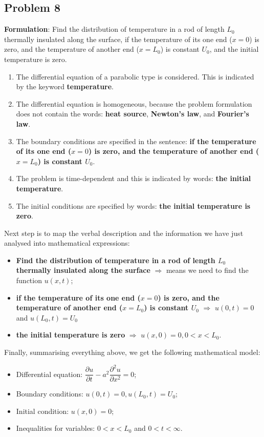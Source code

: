 \subsection{Problem 8}

{\bfseries Formulation}: Find the distribution of temperature in a rod of length $L_{0}$ thermally insulated along the surface, if the temperature of its one end ($x=0$) is zero, and the temperature of another end ($x=L_{0}$) is constant $U_{0}$, and the initial temperature is zero.
\begin{enumerate}
\item The differential equation of a parabolic type is considered. This is indicated by the keyword {\bfseries temperature}.
\item The differential equation is homogeneous, because the problem formulation does not contain the words: {\bfseries heat source}, {\bfseries Newton's law}, and {\bfseries Fourier's law}.
\item The boundary conditions are specified in the sentence: {\bfseries if the temperature of its one end ($x=0$) is zero, and the temperature of another end ($x=L_{0}$) is constant $U_{0}$}.
\item The problem is time-dependent and this is indicated by words: {\bfseries the initial temperature}.
\item The initial conditions are specified by words: {\bfseries the initial temperature is zero}.
\end{enumerate}
Next step is to map the verbal description and the information we have just analysed into mathematical expressions:
\begin{itemize}
\item {\bfseries Find the distribution of temperature in a rod of length $L_{0}$ thermally insulated along the surface} $\Longrightarrow$ means we need to find the function $u(x,t)$;
\item {\bfseries if the temperature of its one end ($x=0$) is zero, and the temperature of another end ($x=L_{0}$) is constant $U_{0}$} $\Longrightarrow$ $u(0,t)=0$ and $u(L_{0},t)=U_{0}$
\item {\bfseries the initial temperature is zero} $\Longrightarrow$ $u(x,0)=0, 0<x<L_{0}$.
\end{itemize}
Finally, summarising everything above, we get the following mathematical model:
\begin{itemize}
\item Differential equation: $\dfrac{\partial u}{\partial t} - a^{2}\dfrac{\partial^{2} u}{\partial x^{2}}=0$;
\item Boundary conditions: $u(0,t)=0, u(L_{0},t)=U_{0}$;
\item Initial condition: $u(x,0)=0$;
\item Inequalities for variables: $0<x<L_{0}$ and $0<t<\infty$.
\end{itemize}

